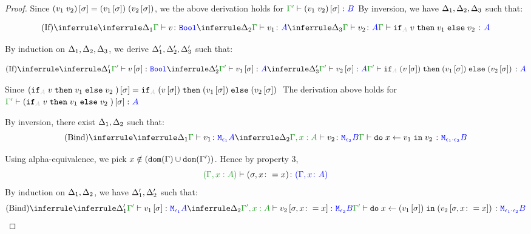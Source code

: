 \documentclass{report}
\begin{document}
\begin{framed}
\begin{proof}
            Since $(v_1\; v_2)\left[\sigma\right] = (v_1\left[\sigma\right])\;(v_2\left[\sigma\right])$, we the above derivation holds for $\typerelation{\G'}{(\apply{v_1}{v_2})\ssi}{B}$
            By inversion, we have $\Delta_1,\Delta_2,\Delta_3$ such that:
        
            \begin{equation}
                \ntreeruleIII{If}{
                    \treeruleI{\D_1}{\typerelation{\G}{v}{\B}}
                    }{
                    \treeruleI{\D_2}{\typerelation{\G}{v_1}{ A}}
                    }{
                    \treeruleI{\D_3}{\typerelation{\G}{v_2}{ A}}
                }{
                    \typerelation{\G}{\pifthenelse{A}{v}{v_1}{v_2}}{ A}
                }
            \end{equation}
        
            By induction on $\Delta_1,\Delta_2, \Delta_3$, we derive 
            $\Delta_1', \Delta_2',\Delta_3'$ such that:
            
            \begin{equation}
                \ntreeruleIII{If}{
                    \treeruleI{\D_1'}{\typerelation{\G'}{v\ssi}{\B}}
                    }{
                    \treeruleI{\D_2'}{\typerelation{\G'}{v_1\ssi}{ A}}
                    }{
                    \treeruleI{\D_3'}{\typerelation{\G'}{v_2\ssi}{ A}}
                }{
                    \typerelation{\G'}{\pifthenelse{A}{(v\ssi)}{(v_1\ssi)}{(v_2\ssi)}}{ A}
                }
            \end{equation}
        
            Since $(\pifthenelse{A}{v}{v_1}{v_2})\ssi = \pifthenelse{A}{(v\ssi)}{(v_1\ssi)}{(v_2\ssi)}$ The derivation above holds for $\typerelation{\G'}{(\pifthenelse{A}{v}{v_1}{v_2})\ssi}{ A}$
        
            By inversion, there exist $\Delta_1, \Delta_2$ such that:
            \begin{equation}
                \ntreeruleII{Bind}{
                    \treeruleI{\D_1}{\typerelation{\G}{v_1}{\M{\e_1}{A}}}
                    }{
                    \treeruleI{\D_2}{\typerelation{\G, x:A}{v_2}{\M{\e_2}{B}}}
                }{\typerelation{\G}{\doin{x}{v_1}{v_2}}{\M{\e_1\dot\e_2}{B}}}
            \end{equation}
        
            Using alpha-equivalence, we pick $x\notin(\texttt{dom}(\Gamma)\cup\texttt{dom}(\Gamma'))$. Hence by property 3, $$\typerelation{(\G, x: A)}{(\si, x\setto x)}{(\gax)}$$
            By induction on $\Delta_1, \Delta_2$, we have $\Delta_1', \Delta_2'$ such that:
            \begin{equation}
                \ntreeruleII{Bind}{
                    \treeruleI{\D_1'}{\typerelation{\G'}{v_1\ssi}{\M{\e_1}{A}}}
                    }{
                    \treeruleI{\D_2}{\typerelation{\G', x:A}{v_2\sub{\si, x\setto x}}{\M{\e_2}{B}}}
                }{\typerelation{\G'}{\doin{x}{(v_1\ssi)}{(v_2\sub{\si, x\setto x})}}{\M{\e_1\dot\e_2}{B}}}
            \end{equation}
        

\end{proof}
\end{framed}
\end{document}
